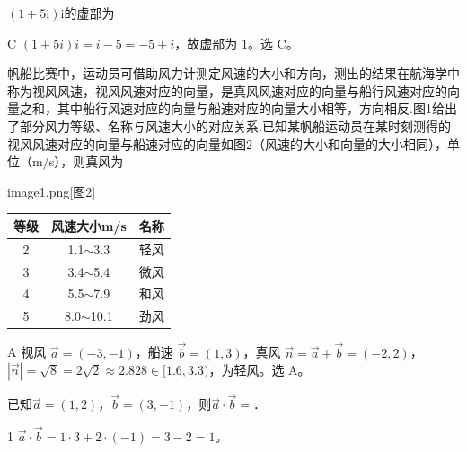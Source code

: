 


\begin{question}
$(1+5\text{i})\text{i}$的虚部为\choiceBox
{}
\end{question}
\begin{answer}{C}
$(1+5i)i=i-5=-5+i$，故虚部为 $1$。选 C。
\end{answer}

\begin{question}
帆船比赛中，运动员可借助风力计测定风速的大小和方向，测出的结果在航海学中称为视风风速，视风风速对应的向量，是真风风速对应的向量与船行风速对应的向量之和，其中船行风速对应的向量与船速对应的向量大小相等，方向相反.图1给出了部分风力等级、名称与风速大小的对应关系.已知某帆船运动员在某时刻测得的视风风速对应的向量与船速对应的向量如图2（风速的大小和向量的大小相同），单位（m/s），则真风为\choiceBox
\begin{questionImageRight}[0.28\linewidth]{image1.png}[图2]
\centering
\begin{tabular}{|c|c|c|}
\hline
等级 & 风速大小m/s & 名称 \\ \hline
2 & 1.1$\sim$3.3 & 轻风 \\ \hline
3 & 3.4$\sim$5.4 & 微风 \\ \hline
4 & 5.5$\sim$7.9 & 和风 \\ \hline
5 & 8.0$\sim$10.1 & 劲风 \\ \hline
\end{tabular}
\par{}
\end{questionImageRight}
\end{question}
\begin{answer}{A}
视风 $\vec a=(-3,-1)$，船速 $\vec b=(1,3)$，真风 $\vec n=\vec a+\vec b=(-2,2)$，$|\vec n|=\sqrt{8}=2\sqrt2\approx2.828\in[1.6,3.3)$，为轻风。选 A。
\end{answer}

\begin{question}[GPT生成]
已知$\vec a=(1,2)$，$\vec b=(3,-1)$，则$\vec a\cdot\vec b=$\blank{3cm}．
\end{question}
\begin{answer}{1}
$\vec a\cdot\vec b=1\cdot3+2\cdot(-1)=3-2=1$。
\end{answer}

